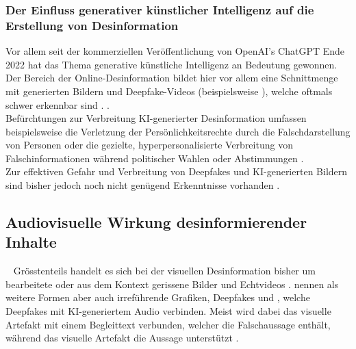 \documentclass[12pt,a4paper]{article}        %
\begin{document}
\subsubsection{Der Einfluss generativer künstlicher Intelligenz auf die Erstellung von Desinformation}
Vor allem seit der kommerziellen Veröffentlichung von OpenAI’s ChatGPT Ende 2022 hat das Thema generative künstliche Intelligenz an Bedeutung gewonnen. Der Bereich der Online-Desinformation bildet hier vor allem eine Schnittmenge mit generierten Bildern und Deepfake-Videos (beispielsweise  \parencite[5]{birrer_what_2024}), welche oftmals schwer erkennbar sind \parencites[7]{montasari_artificial_2022}.  \parencite[4]{bontridder_role_2021}. \\
Befürchtungen zur Verbreitung KI-generierter Desinformation umfassen beispielsweise die Verletzung der Persönlichkeitsrechte durch die Falschdarstellung von Personen oder die gezielte, hyperpersonalisierte Verbreitung von Falschinformationen während politischer Wahlen oder Abstimmungen \parencite[56, 64f]{kertysova_artificial_2018}.\\
Zur effektiven Gefahr und Verbreitung von Deepfakes und KI-generierten Bildern sind bisher jedoch noch nicht genügend Erkenntnisse vorhanden \parencite{birrer_what_2024}.

\subsection{Audiovisuelle Wirkung desinformierender Inhalte}
~\label{theory_audiovisual_content}
Grösstenteils handelt es sich bei der visuellen Desinformation bisher um bearbeitete oder aus dem Kontext gerissene Bilder und Echtvideos \parencite[15]{bradshaw_industrialized_2021}. \textcite[3698]{weikmann_visual_2023} nennen als weitere Formen aber auch irreführende Grafiken, Deepfakes und , welche Deepfakes mit KI-generiertem Audio verbinden. Meist wird dabei das visuelle Artefakt mit einem Begleittext verbunden, welcher die Falschaussage enthält, während das visuelle Artefakt die Aussage unterstützt \parencite[3700]{weikmann_visual_2023}.
\end{document}
